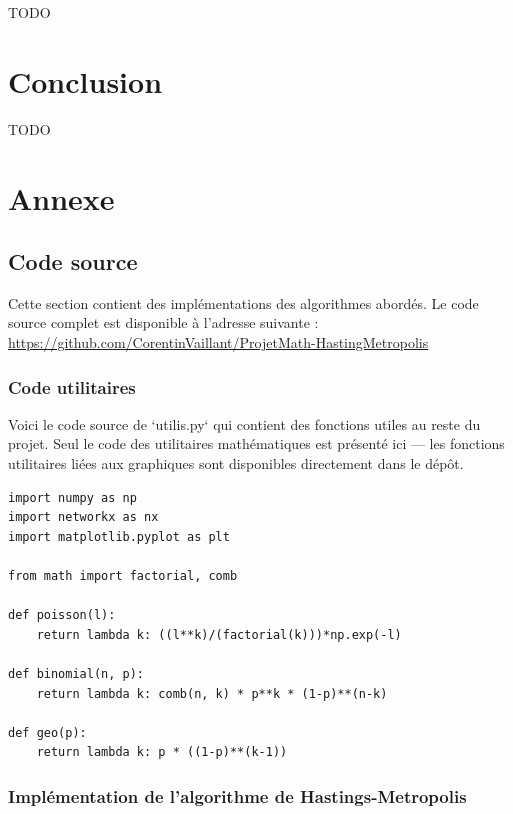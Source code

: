 \documentclass{article}
\begin{document}
TODO \\

\newpage
\section{Conclusion}

TODO \\

\newpage
\section{Annexe}

\subsection{Code source}

Cette section contient des implémentations des algorithmes abordés. Le code source complet est disponible à l’adresse suivante : \url{https://github.com/CorentinVaillant/ProjetMath-HastingMetropolis}

\subsubsection{Code utilitaires}

Voici le code source de `utilis.py` qui contient des fonctions utiles au reste du projet. Seul le code des utilitaires mathématiques est présenté ici — les fonctions utilitaires liées aux graphiques sont disponibles directement dans le dépôt.

\begin{verbatim}
import numpy as np
import networkx as nx
import matplotlib.pyplot as plt

from math import factorial, comb

def poisson(l):
    return lambda k: ((l**k)/(factorial(k)))*np.exp(-l)

def binomial(n, p):
    return lambda k: comb(n, k) * p**k * (1-p)**(n-k)

def geo(p):
    return lambda k: p * ((1-p)**(k-1))
\end{verbatim}

\newpage
\subsubsection{Implémentation de l'algorithme de Hastings-Metropolis}
\end{document}
